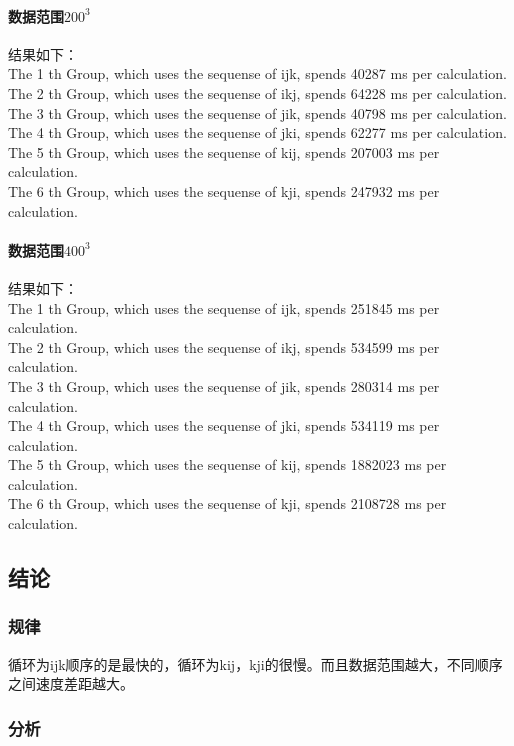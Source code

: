 \documentclass{article}
\begin{document}
\begin{CJK}{UTF8}{gkai}
\paragraph{数据范围$200^{3}$}结果如下：\\
The 1 th Group, which uses the sequense of ijk, spends 40287 ms per calculation.\\
The 2 th Group, which uses the sequense of ikj, spends 64228 ms per calculation.\\
The 3 th Group, which uses the sequense of jik, spends 40798 ms per calculation.\\
The 4 th Group, which uses the sequense of jki, spends 62277 ms per calculation.\\
The 5 th Group, which uses the sequense of kij, spends 207003 ms per calculation.\\
The 6 th Group, which uses the sequense of kji, spends 247932 ms per calculation.\\
\paragraph{数据范围$400^{3}$}结果如下：\\
The 1 th Group, which uses the sequense of ijk, spends 251845 ms per calculation.\\
The 2 th Group, which uses the sequense of ikj, spends 534599 ms per calculation.\\
The 3 th Group, which uses the sequense of jik, spends 280314 ms per calculation.\\
The 4 th Group, which uses the sequense of jki, spends 534119 ms per calculation.\\
The 5 th Group, which uses the sequense of kij, spends 1882023 ms per calculation.\\
The 6 th Group, which uses the sequense of kji, spends 2108728 ms per calculation.\\
\subsection{结论}
\subsubsection{规律}循环为ijk顺序的是最快的，循环为kij，kji的很慢。而且数据范围越大，不同顺序之间速度差距越大。
\subsubsection{分析}

\end{CJK}
\end{document}

